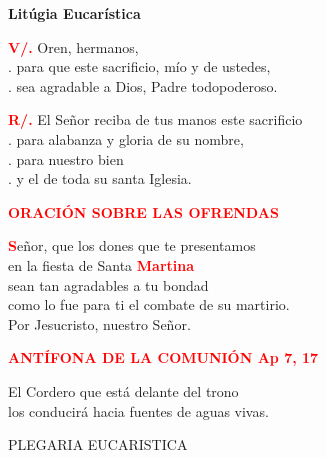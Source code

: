 \documentclass[12pt, letterpaper]{report}
\begin{document}
\newpage

\begin{center}
\Huge {\bfseries Lit\'ugia Eucar\'istica}
\end{center}

\noindent
\Large {\bfseries \textcolor{red}{V/.}} \hspace{0.5cm} Oren, hermanos, \\
. \hspace{1.5cm} para que este sacrificio, m\'io y de ustedes, \\
. \hspace{1.5cm} sea agradable a Dios, Padre todopoderoso. \newline

\noindent
\Large {\bfseries \textcolor{red}{R/.}} \hspace{0.5cm} El Se\~nor reciba de tus manos este sacrificio \\
. \hspace{1.5cm} para alabanza y gloria de su nombre, \\
. \hspace{1.5cm} para nuestro bien \\
. \hspace{1.5cm} y el de toda su santa Iglesia. \newline

\Large {\bfseries \textcolor{red}{ORACI\'ON SOBRE LAS OFRENDAS}}

\lettrine[lines=1]{\bfseries \textcolor{red}{S}}{}\Large e\~nor, que los dones que te presentamos \\
en la fiesta de Santa {\bfseries \textcolor{red}{Martina}} \\
sean tan agradables a tu bondad \\
como lo fue para ti el combate de su martirio. \\
Por Jesucristo, nuestro Se\~nor. \newline

\Large {\bfseries \textcolor{red}{ANT\'IFONA DE LA COMUNI\'ON \hspace{1cm} Ap 7, 17}} \newline

\Large El Cordero que est\'a delante del trono \\
los conducir\'a hacia fuentes de aguas vivas.

\newpage

\begin{center}
\Large PLEGARIA EUCARISTICA
\end{center}
\end{document}
